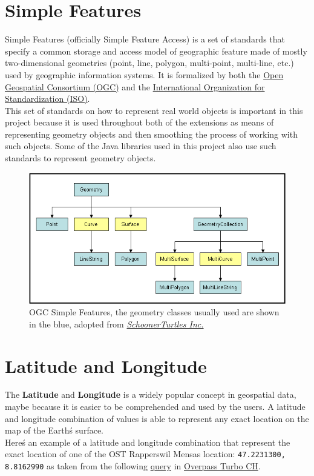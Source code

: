 \section{Simple Features}
Simple Features (officially Simple Feature Access) is a set of standards that specify
a common storage and access model of geographic feature made of mostly
two-dimensional geometries (point, line, polygon, multi-point, multi-line, etc.)
used by geographic information systems.
It is formalized by both the \href{https://www.ogc.org/}{Open Geospatial Consortium (OGC)} and the
\href{https://www.iso.org/home.html}{International Organization for Standardization (ISO)}. \cite{SimpleFeaturesWiki}\\
\newline
This set of standards on how to represent real world objects is important in this project because it is used throughout
both of the extensions as means of representing geometry objects and then smoothing the process of working with such objects.
Some of the Java libraries used in this project also use such standards to represent geometry objects.
\begin{figure}[H]
    \centering
    \includegraphics[width=\linewidth]{./Figures/Spatial_Data/simple_features.png}
    \caption{OGC Simple Features, the geometry classes usually used are shown in the blue, adopted from \href{http://gsp.humboldt.edu/Websites/BlueSpray/STUsersGuide/Scripting/Script_SimpleFeatures.html}{\textit{SchoonerTurtles Inc.}} \cite{SchoonerTurtles}}
\end{figure}
\section{Latitude and Longitude}
The \textbf{Latitude} and \textbf{Longitude} is a widely popular concept in geospatial data, maybe because it is easier
to be comprehended and used by the users. A latitude and longitude combination of values is able to represent any exact location on the map
of the Earth\'s surface.\\
\newline
Here\'s an example of a latitude and longitude combination that represent the exact location of one of the OST Rapperswil
Mensas location: \texttt{47.2231300, 8.8162990} as taken from the following
\href{http://overpass-turbo.osm.ch/?Q=area%0A%20%20%5B%22name%22%3D%22Rapperswil-Jona%22%5D-%3E.a%3B%0A(%0A%09nwr%0A%20%20%20%20(area.a)%0A%20%20%20%20%5B%22name%22%3D%22Mensa%20OST%20Campus%20Rapperswil%20Jona%22%5D%3B%0A)%3B%0Aout%20center%3B&C=47.22281;8.81693;19}{query} in
\href{http://overpass-turbo.osm.ch/}{Overpass Turbo CH}.
